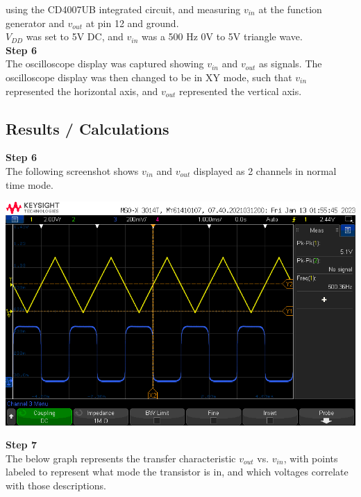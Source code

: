 \documentclass[notitlepage, 12pt]{report}  %
\begin{document}
using the CD4007UB integrated circuit, and measuring $v_{in}$ at the function generator and $v_{out}$ at pin 12 and ground.\\
$V_{DD}$ was set to 5V DC, and $v_{in}$ was a 500 Hz 0V to 5V triangle wave.\\

\textbf{Step 6}\\
The oscilloscope display was captured showing $v_{in}$ and $v_{out}$ as signals. The oscilloscope display was then changed 
to be in XY mode, such that $v_{in}$ represented the horizontal axis, and $v_{out}$ represented the vertical axis.\\

\newpage

\subsection*{Results / Calculations}

\textbf{Step 6}\\

The following screenshot shows $v_{in}$ and $v_{out}$ displayed as 2 channels in normal time mode.\\

\begin{center}
    \includegraphics[scale=0.5]{scope2.png}
\end{center}

\newpage

\textbf{Step 7}\\

\vspace{4pt}
The below graph represents the transfer characteristic $v_{out}$ vs. $v_{in}$, with points labeled to represent
what mode the transistor is in, and which voltages correlate with those descriptions.\\
\end{document}
